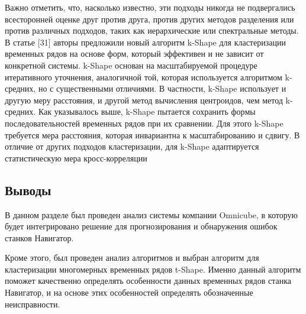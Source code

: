 Важно отметить, что, насколько известно, эти подходы никогда не подвергались
всесторонней оценке друг против друга, против других методов разделения или против различных подходов, 
таких как иерархические или спектральные методы. 
В статье [31] авторы предложили новый алгоритм k-Shape для кластеризации временных рядов на основе форм, 
который эффективен и не зависит от конкретной системы. k-Shape основан на масштабируемой процедуре итеративного уточнения, 
аналогичной той, которая используется алгоритмом k-средних, но с существенными отличиями. 
В частности, k-Shape использует и другую меру расстояния, и другой метод вычисления центроидов, чем метод k-средних.
Как указывалось выше, k-Shape пытается сохранить формы последовательностей временных рядов при их сравнении. 
Для этого k-Shape требуется мера расстояния, которая инвариантна к масштабированию и сдвигу.
В отличие от других подходов кластеризации,
для k-Shape адаптируется статистическую мера кросс-корреляции

\clearpage

\subsection{Выводы}

В данном разделе был проведен анализ системы компании Omnicube, в которую
будет интегрировано решение для прогнозирования и обнаружения ошибок станков Навигатор.

Кроме этого, был проведен анализ алгоритмов и выбран алгоритм для кластеризации многомерных временных рядов t-Shape.
Именно данный алгоритм поможет качественно определять особенности данных временных рядов станка Навигатор,
и на основе этих особенностей определять обозначенные неисправности.

\clearpage